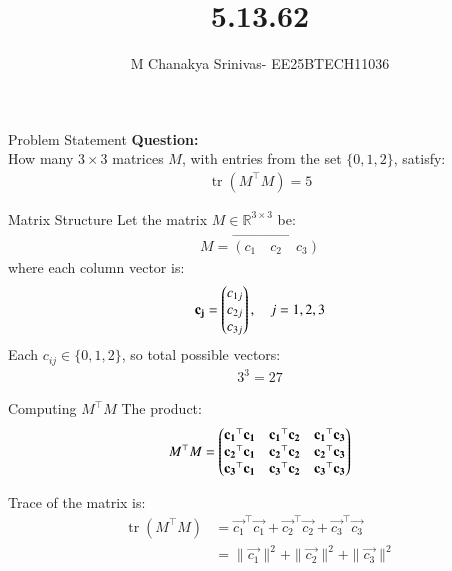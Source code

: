 \documentclass{beamer}
\title %
{5.13.62}
\date{}
\author %
{M Chanakya Srinivas- EE25BTECH11036}
\begin{document}
\frame{\titlepage}




\begin{frame}{Problem Statement}
\textbf{Question:} \\[0.5em]
How many \( 3 \times 3 \) matrices \( M \), with entries from the set \( \{0,1,2\} \), satisfy:
\begin{align}
\operatorname{tr}(M^\top M) = 5
\end{align}
\end{frame}


\begin{frame}{Matrix Structure}
Let the matrix \( M \in \mathbb{R}^{3 \times 3} \) be:
\begin{align}
M = \vec{(c_1 \quad c_2 \quad c_3)}
\end{align}
where each column vector is:
\begin{align}
\mathbf{c_j} = \begin{pmatrix}c_{1j} \\ c_{2j} \\ c_{3j}\end{pmatrix}, \quad j = 1,2,3
\end{align}
Each \( c_{ij} \in \{0,1,2\} \), so total possible vectors:
\begin{align}
3^3 = 27
\end{align}
\end{frame}


\begin{frame}{Computing \( M^\top M \)}
The product:
\begin{align}
M^\top M = 
\begin{pmatrix}
\mathbf{c_1}^\top \mathbf{c_1} & \mathbf{c_1}^\top \mathbf{c_2} & \mathbf{c_1}^\top \mathbf{c_3} \\
\mathbf{c_2}^\top \mathbf{c_1} & \mathbf{c_2}^\top \mathbf{c_2} & \mathbf{c_2}^\top \mathbf{c_3} \\
\mathbf{c_3}^\top \mathbf{c_1} & \mathbf{c_3}^\top \mathbf{c_2} & \mathbf{c_3}^\top \mathbf{c_3}
\end{pmatrix}
\end{align}

Trace of the matrix is:
\begin{align}
\operatorname{tr}(M^\top M) &= \vec{c_1}^\top \vec{c_1} + \vec{c_2}^\top \vec{c_2} + \vec{c_3}^\top \vec{c_3} \\
&= \|\vec{c_1}\|^2 + \|\vec{c_2}\|^2 + \|\vec{c_3}\|^2
\end{align}
\end{frame}
\end{document}
